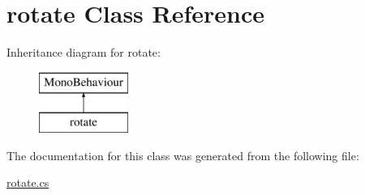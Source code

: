 \hypertarget{classrotate}{}\section{rotate Class Reference}
\label{classrotate}
Inheritance diagram for rotate\+:\begin{figure}[H]
\begin{center}
\leavevmode
\includegraphics[height=2.000000cm]{classrotate}
\end{center}
\end{figure}


The documentation for this class was generated from the following file\+:\begin{DoxyCompactItemize}
\item 
\hyperlink{rotate_8cs}{rotate.\+cs}\end{DoxyCompactItemize}
